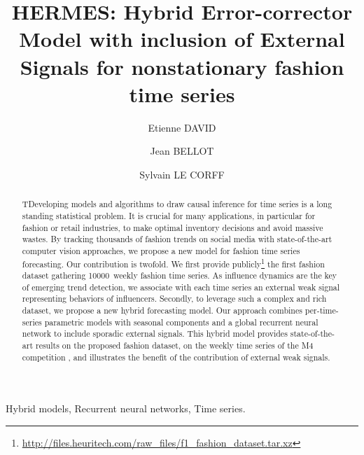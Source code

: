\documentclass[review]{elsarticle}
\newcommand{\numberts}{10000}
\begin{document}
\begin{frontmatter}

\title{HERMES: Hybrid Error-corrector Model with inclusion of External Signals for nonstationary fashion time series}

\author[mymainaddress,mysecondaryaddress]{Etienne DAVID}

\author[mysecondaryaddress]{Jean BELLOT}

\author[mymainaddress]{Sylvain LE CORFF} 

\address[mymainaddress]{\small  Samovar, T\'el\'ecom SudParis,  D\'epartement CITI, Institut Polytechnique de Paris, France.}
\address[mysecondaryaddress]{Heuritech, 71 Rue Réaumur, 75002 Paris, France.}

\begin{abstract}
TDeveloping models and algorithms to draw causal inference for time series is a long standing statistical problem. It is crucial for many applications, in particular for fashion or retail industries, to make optimal inventory decisions and avoid massive wastes. By tracking thousands of fashion trends on social media with state-of-the-art computer vision approaches, we propose a new model for fashion time series forecasting. Our contribution is  twofold. We first provide publicly\footnote[1]{\url{http://files.heuritech.com/raw_files/f1_fashion_dataset.tar.xz}} the first fashion dataset gathering \numberts\ weekly fashion time series. As influence dynamics are the key of emerging trend detection, we associate with each time series an external weak signal representing behaviors of influencers. Secondly, to leverage such a complex and rich dataset, we propose a new hybrid forecasting model. Our approach combines per-time-series parametric models with seasonal components and a global recurrent neural network to include sporadic external signals. This hybrid model provides state-of-the-art results on the proposed fashion dataset, on the weekly time series of the M4 competition \cite{makridakis2018m4}, and illustrates the benefit of the contribution of external weak signals.
\end{abstract}

\begin{keyword}
Hybrid models, Recurrent neural networks, Time series.
\end{keyword}

\end{frontmatter}
\end{document}
